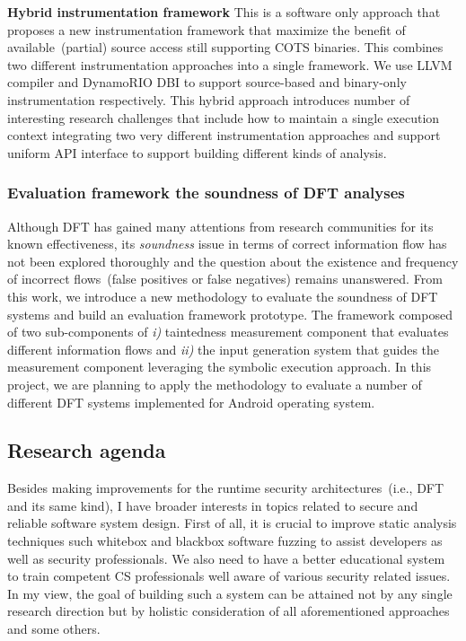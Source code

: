 \documentclass[letterpaper, 10pt]{article}
\begin{document}
\begin{small}
{\bf Hybrid instrumentation framework} This is a software only approach that
proposes a new instrumentation framework that maximize the benefit of
available~(partial) source access still supporting COTS binaries.
%
This combines two different instrumentation approaches into a single framework.
We use LLVM compiler and DynamoRIO DBI to support source-based and binary-only
instrumentation respectively.
%
This hybrid approach introduces number of interesting research challenges that
include how to maintain a single execution context integrating two very different
instrumentation approaches and support uniform API interface to support
building different kinds of analysis.
%

\subsubsection*{Evaluation framework the soundness of DFT analyses}
%
Although DFT has gained many attentions from research communities for its known
effectiveness, its {\it soundness} issue in terms of correct information flow
has not been explored thoroughly and the question about the existence and
frequency of incorrect flows~(false positives or false negatives) remains
unanswered. From this work, we introduce a new methodology to evaluate the
soundness of DFT systems and build an evaluation framework prototype. 
%
The framework composed of two sub-components of {\it i)} taintedness
measurement component that evaluates different information flows and {\it ii)}
the input generation system that guides the measurement component leveraging
the symbolic execution approach.
%
In this project, we are planning to apply the methodology to evaluate a number
of different DFT systems implemented for Android operating system.

%
%
\subsection*{Research agenda}
%
Besides making improvements for the runtime security architectures~(i.e., DFT
and its same kind), I have broader interests in topics related to secure and
reliable software system design.
%
First of all, it is crucial to improve static analysis techniques such whitebox
and blackbox software fuzzing to assist developers as well as security
professionals. 
%
We also need to have a better educational system to train competent CS
professionals well aware of various security related issues.
%
In my view, the goal of building such a system can be attained not by any
single research direction but by holistic consideration of all aforementioned
approaches and some others.


\end{small}
\end{document}
